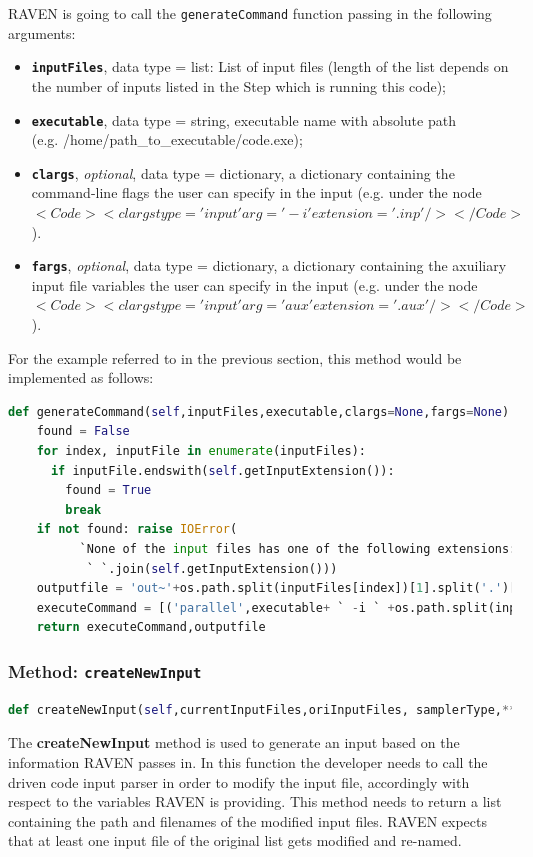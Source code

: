 RAVEN is going to call the \texttt{generateCommand} function passing in the following arguments:
\begin{itemize}
  \item \textbf{\texttt{inputFiles}}, data type = list: List of input files (length of the list depends on the
           number of inputs listed in the Step which is running this code);
  \item \textbf{\texttt{executable}}, data type = string, executable name with absolute
            path \\(e.g. /home/path\_to\_executable/code.exe);
  \item  \textbf{\texttt{clargs}}, \emph{optional}, data type = dictionary, a dictionary containing the command-line flags the
               user can specify in the input (e.g. under the node $<Code><clargs type='input' arg='-i' extension='.inp'/></Code>$).
  \item  \textbf{\texttt{fargs}}, \emph{optional}, data type = dictionary, a dictionary containing the axuiliary input file variables the
               user can specify in the input (e.g. under the node $<Code><clargs type='input' arg='aux' extension='.aux'/></Code>$).
\end{itemize}
For the example referred to in the previous section, this method would be implemented as follows:
\newline
\begin{lstlisting}[language=python]
  def generateCommand(self,inputFiles,executable,clargs=None,fargs=None):
    found = False
    for index, inputFile in enumerate(inputFiles):
      if inputFile.endswith(self.getInputExtension()):
        found = True
        break
    if not found: raise IOError(
          `None of the input files has one of the following extensions: ` +
           ` `.join(self.getInputExtension()))
    outputfile = 'out~'+os.path.split(inputFiles[index])[1].split('.')[0]
    executeCommand = [('parallel',executable+ ` -i ` +os.path.split(inputFiles[index])[1])]
    return executeCommand,outputfile
\end{lstlisting}


\subsubsection{Method: \texttt{createNewInput}}
\label{subsubsec:createNewInput}
\begin{lstlisting}[language=python]
def createNewInput(self,currentInputFiles,oriInputFiles, samplerType,**Kwargs)
\end{lstlisting}
The \textbf{createNewInput} method is used to generate an input based
on the information RAVEN passes in. In this function the developer needs to
call the driven code input parser in order to modify the input file, accordingly with
respect to the variables RAVEN is providing. This method needs to return a list containing
the path and filenames of the modified input files. \nb RAVEN expects that at least one input
file of the original list gets modified and re-named.

